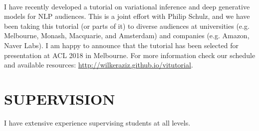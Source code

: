 ~


I have recently developed a tutorial on variational inference and deep generative models for NLP audiences. This is a joint effort with Philip Schulz, and we have been taking this tutorial (or parts of it) to diverse audiences at universities (e.g. Melbourne, Monash, Macquarie, and Amsterdam) and companies (e.g. Amazon, Naver Labs). I am happy to announce that the tutorial has been selected for presentation at ACL 2018 in Melbourne. For more information check our schedule and available resources: \url{http://wilkeraziz.github.io/vitutorial}.




\pagebreak

\section*{SUPERVISION}

I have extensive experience supervising students at all levels. 


